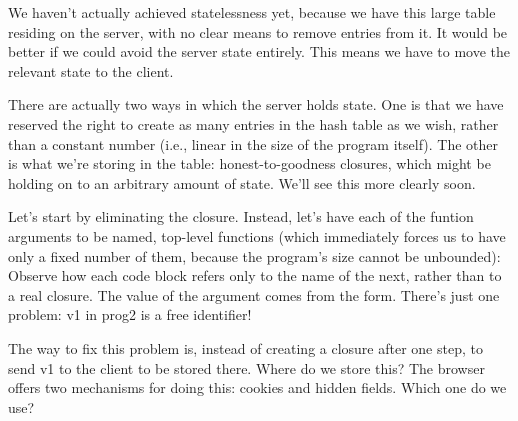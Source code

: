 
We haven’t actually achieved statelessness yet, because we have this large table
residing on the server, with no clear means to remove entries from it. It would
be better if we could avoid the server state entirely. This means we have to
move the relevant state to the client.

There are actually two ways in which the server holds state. One is that we have
reserved the right to create as many entries in the hash table as we wish,
rather than a constant number (i.e., linear in the size of the program itself).
The other is what we’re storing in the table: honest-to-goodness closures, which
might be holding on to an arbitrary amount of state. We’ll see this more clearly
soon.

Let’s start by eliminating the closure. Instead, let’s have each of the funtion
arguments to be named, top-level functions (which immediately forces us to have
only a fixed number of them, because the program’s size cannot be unbounded):
Observe how each code block refers only to the name of the next, rather than to
a real closure. The value of the argument comes from the form. There’s just one
problem:
v1 in prog2 is a free identifier!

The way to fix this problem is, instead of creating a closure after one step, to
send v1 to the client to be stored there. Where do we store this? The browser
offers two mechanisms for doing this: cookies and hidden fields. Which one do we
use?
